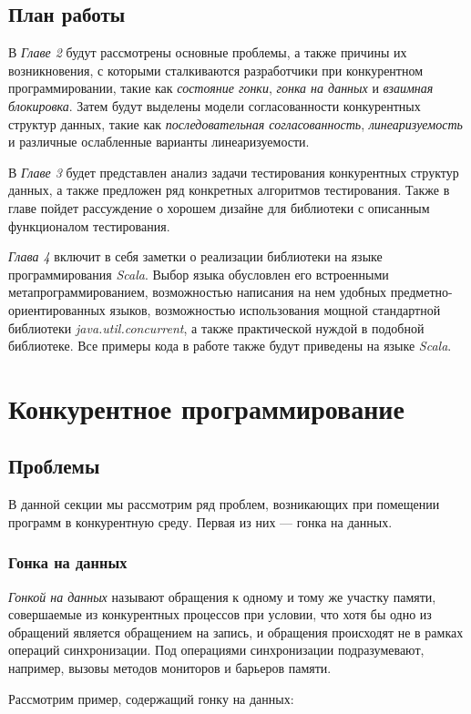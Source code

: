 \documentclass[14pt, openany]{book}
\begin{document}
\section{План работы}
В \textit{Главе 2} будут рассмотрены основные проблемы, а также причины их возникновения, с которыми сталкиваются разработчики при конкурентном программировании, такие как \textit{состояние гонки}, \textit{гонка на данных} и \textit{взаимная блокировка}. Затем будут выделены модели согласованности конкурентных структур данных, такие как \textit{последовательная согласованность}, \textit{линеаризуемость} и различные ослабленные варианты линеаризуемости.\par
В \textit{Главе 3} будет представлен анализ задачи тестирования конкурентных структур данных, а также предложен ряд конкретных алгоритмов тестирования. Также в главе пойдет рассуждение о хорошем дизайне для библиотеки с описанным функционалом тестирования. \par
\textit{Глава 4} включит в себя заметки о реализации библиотеки на языке программирования \textit{Scala}. Выбор языка обусловлен его встроенными метапрограммированием, возможностью написания на нем удобных предметно-ориентированных языков, возможностью использования мощной стандартной библиотеки \linebreak \textit{java.util.concurrent}, а также практической нуждой в подобной библиотеке. Все примеры кода в работе также будут приведены на языке \textit{Scala}.

\chapter{Конкурентное программирование}

\section{Проблемы}
В данной секции мы рассмотрим ряд проблем, возникающих при помещении программ в конкурентную среду.
Первая из них --- гонка на данных.

\subsection{Гонка на данных}
\textit{Гонкой на данных} называют \cite{dataRace} обращения к одному и тому же участку памяти, совершаемые из конкурентных процессов при условии, что хотя бы одно из обращений является обращением на запись, и обращения происходят не в рамках операций синхронизации. Под операциями синхронизации подразумевают, например, вызовы методов мониторов и барьеров памяти.
\par Рассмотрим пример, содержащий гонку на данных:
\end{document}
